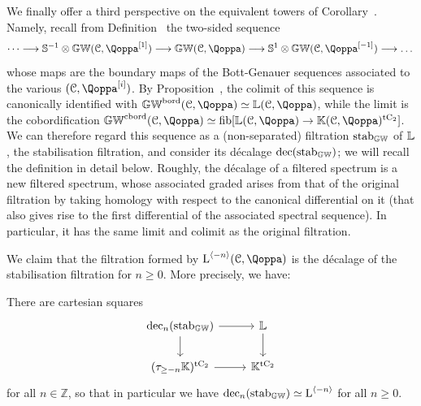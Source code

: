 We finally offer a third perspective on the equivalent towers of Corollary~. Namely, recall from Definition~ the two-sided sequence
\[
\dots \longrightarrow \SS^{-1} \otimes \KGW(\C,\QF\qshift{1}) \longrightarrow \KGW(\C,\QF) \longrightarrow \SS^1 \otimes \KGW(\C,\QF\qshift{-1}) \longrightarrow \dots
\]
whose maps are the boundary maps of the Bott-Genauer sequences associated to the various $(\C,\QF\qshift{i})$. By Proposition~, the colimit of this sequence is canonically identified with $\KGW^\bord(\C,\QF) \simeq \KL(\C,\QF)$, while the limit is the cobordification $\KGW^\mathrm{cbord}(\C,\QF) \simeq \fib[\LL(\C,\QF) \rightarrow \KK(\C,\QF)^\tC]$. We can therefore regard this sequence as a (non-separated) filtration $\mathrm{stab}_{\mathbb{GW}}$ of $\mathbb{L}$, the stabilisation filtration, and consider its décalage $\mathrm{dec}(\mathrm{stab}_{\mathbb{GW}})$; we will recall the definition in detail below. Roughly, the décalage of a filtered spectrum is a new filtered spectrum, whose associated graded arises from that of the original filtration by taking homology with respect to the canonical differential on it (that also gives rise to the first differential of the associated spectral sequence). In particular, it has the same limit and colimit as the original filtration. 

We claim that the filtration formed by $\L^{\cotower {-n}}(\C, \QF)$ is the décalage of the stabilisation filtration for $n\geq 0$. More precisely, we have:

\begin{proposition}
\label{prop:dec-stab}%
There are cartesian squares
\[
\begin{tikzcd} 
\dec_n(\mathrm{stab}_\KGW) \ar[d] \ar[r] & \LL \ar[d] \\
(\tau_{\geq -n} \KK)^\tC \ar[r] & \KK^\tC
\end{tikzcd}
\]
for all $n \in \mathbb Z$, so that in particular we have $\mathrm{dec}_{n}(\mathrm{stab}_{\mathbb{GW}}) \simeq \operatorname L^{\langle -n \rangle}$ for all $n \geq 0$.
\end{proposition}



